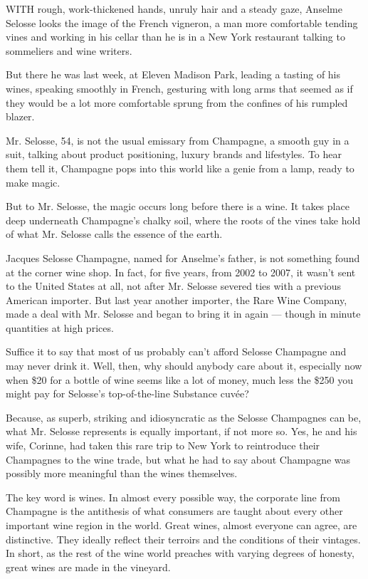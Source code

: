 WITH rough, work-thickened hands, unruly hair and a steady gaze, Anselme
Selosse looks the image of the French vigneron, a man more comfortable
tending vines and working in his cellar than he is in a New York
restaurant talking to sommeliers and wine writers.

But there he was last week, at Eleven Madison Park, leading a tasting of
his wines, speaking smoothly in French, gesturing with long arms that
seemed as if they would be a lot more comfortable sprung from the
confines of his rumpled blazer.

Mr. Selosse, 54, is not the usual emissary from Champagne, a smooth guy
in a suit, talking about product positioning, luxury brands and
lifestyles. To hear them tell it, Champagne pops into this world like a
genie from a lamp, ready to make magic.

But to Mr. Selosse, the magic occurs long before there is a wine. It
takes place deep underneath Champagne's chalky soil, where the roots of
the vines take hold of what Mr. Selosse calls the essence of the earth.

Jacques Selosse Champagne, named for Anselme's father, is not something
found at the corner wine shop. In fact, for five years, from 2002 to
2007, it wasn't sent to the United States at all, not after Mr. Selosse
severed ties with a previous American importer. But last year another
importer, the Rare Wine Company, made a deal with Mr. Selosse and began
to bring it in again --- though in minute quantities at high prices.

Suffice it to say that most of us probably can't afford Selosse
Champagne and may never drink it. Well, then, why should anybody care
about it, especially now when \$20 for a bottle of wine seems like a lot
of money, much less the \$250 you might pay for Selosse's
top-of-the-line Substance cuvée?

Because, as superb, striking and idiosyncratic as the Selosse Champagnes
can be, what Mr. Selosse represents is equally important, if not more
so. Yes, he and his wife, Corinne, had taken this rare trip to New York
to reintroduce their Champagnes to the wine trade, but what he had to
say about Champagne was possibly more meaningful than the wines
themselves.

The key word is wines. In almost every possible way, the corporate line
from Champagne is the antithesis of what consumers are taught about
every other important wine region in the world. Great wines, almost
everyone can agree, are distinctive. They ideally reflect their terroirs
and the conditions of their vintages. In short, as the rest of the wine
world preaches with varying degrees of honesty, great wines are made in
the vineyard.

